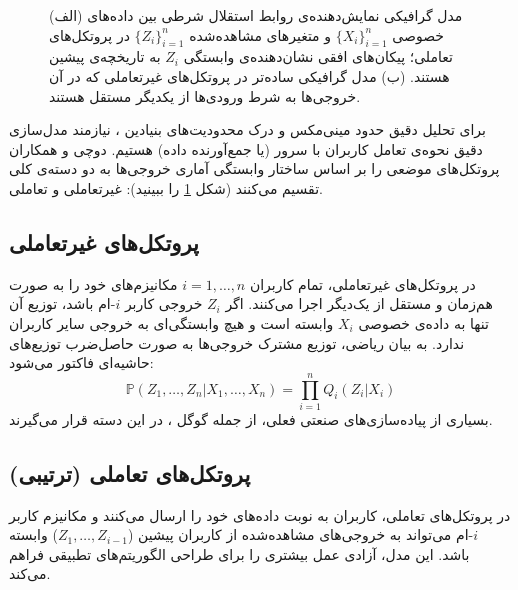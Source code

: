 \begin{figure}[ht]
    
    \caption[مدل گرافیکی پروتکل‌های تعاملی و غیرتعاملی.]{
    (الف) مدل گرافیکی نمایش‌دهنده‌ی روابط استقلال شرطی بین داده‌های خصوصی $\{X_i\}_{i=1}^n$ و متغیرهای مشاهده‌شده $\{Z_i\}_{i=1}^n$ در پروتکل‌های تعاملی؛ پیکان‌های افقی نشان‌دهنده‌ی وابستگی $Z_i$ به تاریخچه‌ی پیشین هستند.
    (ب) مدل گرافیکی ساده‌تر در پروتکل‌های غیرتعاملی که در آن خروجی‌ها به شرط ورودی‌ها از یکدیگر مستقل هستند.
    }
    \label{fig:interactive-vs-noninteractive}
\end{figure}

برای تحلیل دقیق حدود مینی‌مکس و درک محدودیت‌های بنیادین ، نیازمند مدل‌سازی دقیق نحوه‌ی تعامل کاربران با سرور (یا جمع‌آورنده داده) هستیم. دوچی و همکاران \cite{Duchi2013} پروتکل‌های موضعی را بر اساس ساختار وابستگی آماری خروجی‌ها به دو دسته‌ی کلی تقسیم می‌کنند (شکل \ref{fig:interactive-vs-noninteractive} را ببینید): غیرتعاملی و تعاملی.

\subsection{پروتکل‌های غیرتعاملی}
در پروتکل‌های غیرتعاملی، تمام کاربران $i=1, \dots, n$ مکانیزم‌های خود را به صورت هم‌زمان و مستقل از یک‌دیگر اجرا می‌کنند. اگر $Z_i$ خروجی کاربر $i$-ام باشد، توزیع آن تنها به داده‌ی خصوصی $X_i$ وابسته است و هیچ وابستگی‌ای به خروجی سایر کاربران ندارد.
به بیان ریاضی، توزیع مشترک خروجی‌ها به صورت حاصل‌ضرب توزیع‌های حاشیه‌ای فاکتور می‌شود:
\begin{equation}
\mathbb{P}\left(Z_1, \dots, Z_n | X_1, \dots, X_n\right) = \prod_{i=1}^n Q_i(Z_i | X_i)
\end{equation}
بسیاری از پیاده‌سازی‌های صنعتی فعلی، از جمله  گوگل \cite{Erlingsson2014}، در این دسته قرار می‌گیرند.

\subsection{پروتکل‌های تعاملی (ترتیبی)}
در پروتکل‌های تعاملی، کاربران به نوبت داده‌های خود را ارسال می‌کنند و مکانیزم کاربر $i$-ام می‌تواند به خروجی‌های مشاهده‌شده از کاربران پیشین ($Z_1, \dots, Z_{i-1}$) وابسته باشد. این مدل، آزادی عمل بیشتری را برای طراحی الگوریتم‌های تطبیقی فراهم می‌کند.

